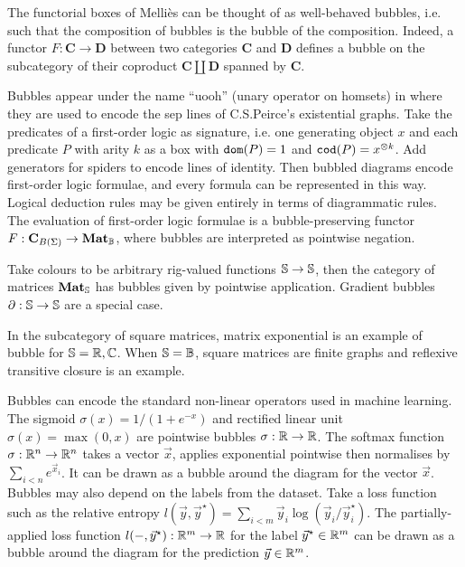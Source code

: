 \begin{example}
The functorial boxes of Melli\`es \cite{Mellies06} can be thought of as
well-behaved bubbles, i.e. such that the composition of bubbles is the
bubble of the composition. Indeed, a functor $F : \mathbf{C} \to \mathbf{D}$
between two categories $\mathbf{C}$ and $\mathbf{D}$ defines a bubble on the
subcategory of their coproduct $\mathbf{C} \coprod \mathbf{D}$ spanned by $\mathbf{C}$.
\end{example}

\begin{example}
Bubbles appear under the name ``uooh'' (unary operator on homsets) in
\cite{HaydonSobocinski20} where they are used to encode the sep lines of
C.S.Peirce's existential graphs.
Take the predicates of a first-order logic as signature, i.e. one
generating object $x$ and each predicate $P$ with arity $k$ as a box with
$\dom(P) = 1$ and $\cod(P) = x^{\otimes k}$. Add generators for spiders to
encode lines of identity.
Then bubbled diagrams encode first-order logic formulae, and every formula can
be represented in this way. Logical deduction rules may be given entirely
in terms of diagrammatic rules.
The evaluation of first-order logic formulae is a bubble-preserving functor
$F : \mathbf{C}_{B(\Sigma)} \to \mathbf{Mat}_\B$, where bubbles are interpreted
as pointwise negation.
\end{example}

\begin{example}
Take colours to be arbitrary rig-valued functions $\S \to \S$, then
the category of matrices $\mathbf{Mat}_\S$ has bubbles given by pointwise
application. Gradient bubbles $\partial : \S \to \S$ are a special case.
\end{example}

\begin{example}
In the subcategory of square matrices, matrix exponential is an example of
bubble for $\S = \R, \C$. When $\S = \B$, square matrices are finite
graphs and reflexive transitive closure is an example.
\end{example}

\begin{example}
Bubbles can encode the standard non-linear operators used in machine learning.
The sigmoid $\sigma(x) = 1 / (1 + e^{-x})$ and rectified linear unit
$\sigma(x) = \max(0, x)$ are pointwise bubbles $\sigma : \R \to \R$.
The softmax function $\sigma : \R^n \to \R^n$ takes a vector $\vec{x}$,
applies exponential pointwise then normalises by $\sum_{i<n} e^{\vec{x}_i}$.
It can be drawn as a bubble around the diagram for the vector $\vec{x}$.
Bubbles may also depend on the labels from the dataset.
Take a loss function such as the relative entropy $l(\vec{y}, \vec{y}^\star)
= \sum_{i < m} \vec{y}_i \log(\vec{y}_i / \vec{y}^\star_i)$.
The partially-applied loss function $l(-, \vec{y}^\star) : \R^m \to \R$ for the
label $\vec{y}^\star \in \R^m$ can be drawn as a bubble around the diagram for
the prediction $\vec{y} \in \R^m$.
\end{example}

